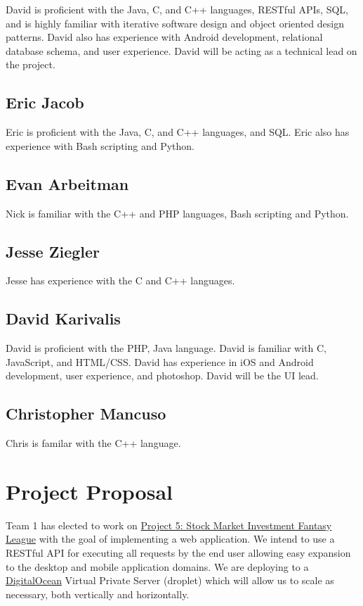\documentclass[11pt,letterpaper,oneside]{memoir}
\begin{document}
David is proficient with the Java, C, and C++ languages, RESTful APIs, SQL, and is
highly familiar with iterative software design and object oriented design patterns.
David also has experience with Android development, relational database schema, and
user experience.  David will be acting as a technical lead on the project.

\section{Eric Jacob}

Eric is proficient with the Java, C, and C++ languages, and SQL.  Eric also has
experience with Bash scripting and Python.

\section{Evan Arbeitman}

Nick is familiar with the C++ and PHP languages, Bash scripting and Python.

\section{Jesse Ziegler}

Jesse has experience with the C and C++ languages.

\section{David Karivalis}

David is proficient with the PHP, Java language. David is familiar with C, JavaScript, and HTML/CSS.
David has experience in iOS and Android development, user experience, and photoshop.  David will be
the UI lead.

\section{Christopher Mancuso}

Chris is familar with the C++ language.

\chapter{Project Proposal}
\label{proposal}
Team 1 has elected to work on \href{http://ece.rutgers.edu/~marsic/books/SE/projects/}
{Project 5: Stock Market Investment Fantasy League} with the goal of implementing a
web application. We intend to use a RESTful API for executing all requests by the end user
allowing easy expansion to the desktop and mobile application domains. We are deploying to
a \href{http://www.digitialocean.com}{DigitalOcean} Virtual Private Server (droplet) which
will allow us to scale as necessary, both vertically and horizontally.\\
\end{document}
